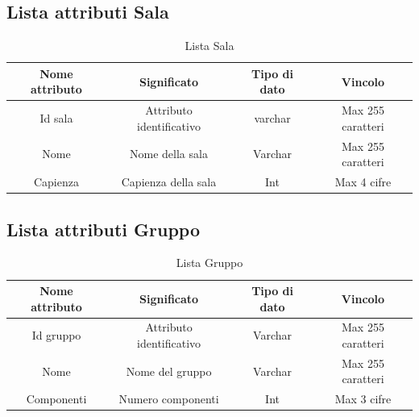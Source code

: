 \documentclass[12pt]{article}
\begin{document}
\clearpage


\subsection*{Lista attributi Sala}
\begin{table}[h!]
    \centering
    \begin{tabular}{|c|c|c|c|}
        \hline
        Nome attributo & Significato & Tipo di dato & Vincolo \\
        \hline
        Id sala & Attributo identificativo & varchar & Max 255 caratteri \\
        \hline
        Nome & Nome della sala & Varchar & Max 255 caratteri \\
        \hline
        Capienza & Capienza della sala & Int & Max 4 cifre \\
        \hline
    \end{tabular}
    \caption{Lista Sala}
    \label{tab: tabella entità sala}
\end{table}


\subsection*{Lista attributi Gruppo}
\begin{table}[h!]
    \centering
    \begin{tabular}{|c|c|c|c|}
        \hline
        Nome attributo & Significato & Tipo di dato & Vincolo \\
        \hline
        Id gruppo & Attributo identificativo & Varchar & Max 255 caratteri \\
        \hline
        Nome & Nome del gruppo & Varchar & Max 255 caratteri \\
        \hline
        Componenti & Numero componenti & Int & Max 3 cifre \\
        \hline
    \end{tabular}
    \caption{Lista Gruppo}
    \label{tab: tabella entità gruppo}
\end{table}

\end{document}
